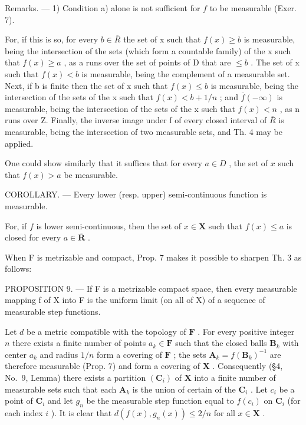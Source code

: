Remarks. --- 1) Condition a) alone is not sufficient for \(f\) to be measurable (Exer. 7).

For, if this is so, for every \(b \in \overline{R}\) the set of x such that \(f(x) \geqslant b\) is measurable, being the intersection of the sets (which form a countable family) of the x such that \(f(x) \geqslant a\) , as a runs over the set of points of D that are \(\leqslant b\) . The set of x such that \(f(x) < b\) is measurable, being the complement of a measurable set. Next, if b is finite then the set of x such that \(f(x) \leqslant b\) is measurable, being the intersection of the sets of the x such that \(f(x) < b + 1/n\) ; and \(\overline{f}(-\infty)\) is measurable, being the intersection of the sets of the x such that \(f(x) < n\) , as n runs over Z. Finally, the inverse image under f of every closed interval of \(\overline{R}\) is measurable, being the intersection of two measurable sets, and Th. 4 may be applied.

One could show similarly that it suffices that for every \(a \in D\) , the set of \(x\) such that \(f(x) > a\) be measurable.

COROLLARY. --- Every lower (resp. upper) semi-continuous function is measurable.

For, if \(f\) is lower semi-continuous, then the set of \(x \in \mathbf{X}\) such that \(f(x) \leqslant a\) is closed for every \(a \in \overline{\mathbf{R}}\) .

When F is metrizable and compact, Prop. 7 makes it possible to sharpen Th. 3 as follows:

PROPOSITION 9. --- If F is a metrizable compact space, then every measurable mapping f of X into F is the uniform limit (on all of X) of a sequence of measurable step functions.

Let \(d\) be a metric compatible with the topology of \(\mathbf{F}\) . For every positive integer \(n\) there exists a finite number of points \(a_{k} \in \mathbf{F}\) such that the closed balls \(\mathbf{B}_{k}\) with center \(a_{k}\) and radius \(1/n\) form a covering of \(\mathbf{F}\) ; the sets \(\mathbf{A}_{k} = f(\mathbf{B}_{k})^{-1}\) are therefore measurable (Prop. 7) and form a covering of \(\mathbf{X}\) . Consequently (§4, No.~9, Lemma) there exists a partition \((\mathbf{C}_{i})\) of \(\mathbf{X}\) into a finite number of measurable sets such that each \(\mathbf{A}_{k}\) is the union of certain of the \(\mathbf{C}_{i}\) . Let \(c_{i}\) be a point of \(\mathbf{C}_{i}\) and let \(g_{n}\) be the measurable step function equal to \(f(c_{i})\) on \(\mathbf{C}_{i}\) (for each index \(i\) ). It is clear that \(d(f(x), g_{n}(x)) \leqslant 2/n\) for all \(x \in \mathbf{X}\) .

